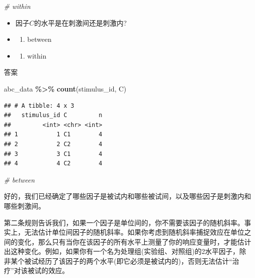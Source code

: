 \documentclass[
]{book}
\newenvironment{Shaded}{\begin{snugshade}}{\end{snugshade}}
\newcommand{\CommentTok}[1]{\textcolor[rgb]{0.56,0.35,0.01}{\textit{#1}}}
\newcommand{\FunctionTok}[1]{\textcolor[rgb]{0.13,0.29,0.53}{\textbf{#1}}}
\newcommand{\NormalTok}[1]{#1}
\newcommand{\SpecialCharTok}[1]{\textcolor[rgb]{0.81,0.36,0.00}{\textbf{#1}}}
\providecommand{\tightlist}{%
  \setlength{\itemsep}{0pt}\setlength{\parskip}{0pt}}
\begin{document}
\begin{Shaded}
\begin{Highlighting}[]
\CommentTok{\# within}
\end{Highlighting}
\end{Shaded}

\begin{itemize}
\item
  因子\(C\)的水平是在刺激间还是刺激内?
\item
  \begin{enumerate}
  \def\labelenumi{(\Alph{enumi})}
  \tightlist
  \item
    between\\
  \end{enumerate}
\item
  \begin{enumerate}
  \def\labelenumi{(\Alph{enumi})}
  \setcounter{enumi}{1}
  \tightlist
  \item
    within
  \end{enumerate}
\end{itemize}

答案

\begin{Shaded}
\begin{Highlighting}[]
\NormalTok{abc\_data }\SpecialCharTok{\%\textgreater{}\%}
  \FunctionTok{count}\NormalTok{(stimulus\_id, C)}
\end{Highlighting}
\end{Shaded}

\begin{verbatim}
## # A tibble: 4 x 3
##   stimulus_id C         n
##         <int> <chr> <int>
## 1           1 C1        4
## 2           2 C2        4
## 3           3 C1        4
## 4           4 C2        4
\end{verbatim}

\begin{Shaded}
\begin{Highlighting}[]
\CommentTok{\# between}
\end{Highlighting}
\end{Shaded}

好的，我们已经确定了哪些因子是被试内和哪些被试间，以及哪些因子是刺激内和哪些刺激间。

第二条规则告诉我们，如果一个因子是单位间的，你不需要该因子的随机斜率。事实上，无法估计单位间因子的随机斜率。如果你考虑到随机斜率捕捉效应在单位之间的变化，那么只有当你在该因子的所有水平上测量了你的响应变量时，才能估计出这种变化。例如，如果你有一个名为处理组(实验组、对照组)的2水平因子，除非某个被试经历了该因子的两个水平(即它必须是被试内的)，否则无法估计``治疗''对该被试的效应。
\end{document}
